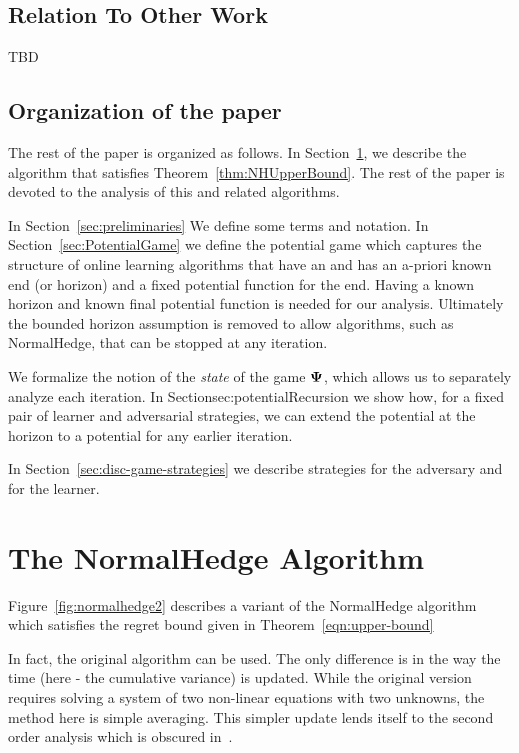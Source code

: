 \documentclass{article}[12pt]
\begin{document}
\subsection{Relation To Other Work}

TBD

\subsection{Organization of the paper}
The rest of the paper is organized as follows. In
Section~\ref{sec:NormalHedgeAlg}, we describe the algorithm that
satisfies Theorem~\ref{thm:NHUpperBound}. The rest of the paper is
devoted to the analysis of this and related algorithms.

In Section~\ref{sec:preliminaries} We define some terms and
notation. In Section~\ref{sec:PotentialGame} we define the potential
game which captures the structure of online learning algorithms that
have an and has an a-priori known end (or horizon) and a fixed
potential function for the end.  Having a known horizon and known
final potential function is needed for our analysis. Ultimately the
bounded horizon assumption is removed to allow algorithms, such as
NormalHedge, that can be stopped at any iteration.

We formalize the notion of the {\em state} of the game ${\bf \Psi}$, which
allows us to separately analyze each iteration. In
Section{sec:potentialRecursion} we show how, for a fixed pair of
learner and adversarial strategies, we can extend the potential at the
horizon to a potential for any earlier iteration.

In Section~\ref{sec:disc-game-strategies} we describe strategies for the adversary and for the learner.

\section{The NormalHedge  Algorithm} \label{sec:NormalHedgeAlg}
Figure~\ref{fig:normalhedge2} describes a variant of the NormalHedge
algorithm~\cite{chaudhuri2009parameter} which satisfies the regret
bound given in Theorem~\ref{eqn:upper-bound}

In fact, the original algorithm can be used. The only difference is in
the way the time (here - the cumulative variance) is updated. While
the original version requires solving a system of two non-linear
equations with two unknowns, the method here is simple averaging.
This simpler update lends itself to the second order analysis which is
obscured in~\cite{chaudhuri2009parameter}.
\end{document}
